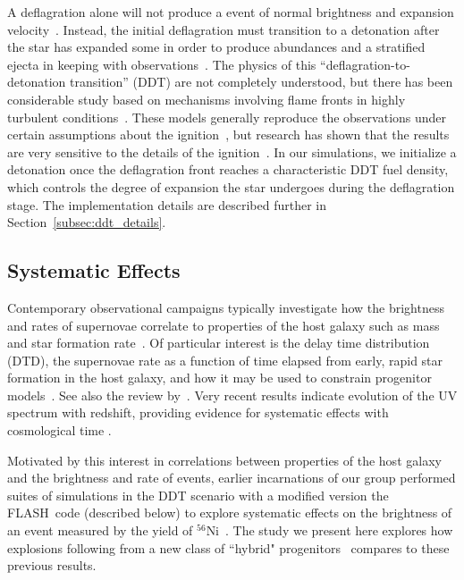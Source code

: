 \documentclass[iop,apj]{emulateapj}
\newcommand{\secref}[1]{Section~\ref{#1}}
\newcommand{\code}[1]{\textsc{#1}}
\newcommand{\FLASH}{\code{FLASH}}
\begin{document}
A deflagration alone will not produce a event of normal brightness and
expansion velocity~\citep{roepkeetal07}. Instead, the initial
deflagration must transition to a detonation after the star has
expanded some in order to produce abundances and a stratified ejecta
in keeping with
observations~\citep{Khokhlov1991Delayed-detonat,hokowh95}.
The physics of this ``deflagration-to-detonation transition'' (DDT)
are not completely understood, but there has been considerable study
based on mechanisms involving flame fronts in highly turbulent
conditions~\citep{1986SvAL, woosley90, Khokhlov1991Delayed-detonat,
  hokowh95, HoefKhok96, khoketal1997, NiemWoos97, hwt98, Niem99,
  GameKhokOran05,roepke07, poletal2011,c-ssr2013,poludnenko2015}.
These models generally reproduce the observations under certain
assumptions about the ignition~\citep{townetal2009}, but research has
shown that the results are very sensitive to the details of the
ignition~\citep{PlewCaldLamb04,GameKhokOran05,garciasenz:2005,
  roepkeetal07,Jordan2008Three-Dimension}.
In our simulations, we
initialize a detonation once the deflagration front reaches a
characteristic DDT fuel density, which controls the degree of
expansion the star undergoes during the deflagration stage. The
implementation details are described further in
\secref{subsec:ddt_details}.


\subsection{Systematic Effects}

Contemporary observational campaigns typically investigate how
the brightness and rates of supernovae correlate to 
properties of the host galaxy such as mass and star formation
rate~\citep[c.f.][]{graurmaoz2013,graurbiancomodjaz2015}. Of
particular interest is the delay time distribution (DTD), the
supernovae rate as a function of time elapsed from 
early, rapid
star formation in the host galaxy, and how it may be used
to constrain progenitor models~\citep{hachisu:2008,
conleyetal2011,howell2011,grauretal2011,biancoetal2011,maozmannuccibrandt2012}.
See also the review by~\citet{maozmannucci2012}.
Very recent results indicate evolution of the UV spectrum with 
redshift, providing evidence for systematic effects with
cosmological time \citep{milneandfoley2015}.

Motivated by this interest in correlations between properties of the
host galaxy and the brightness and rate of events, earlier incarnations of  
our group performed suites of simulations in the DDT scenario
with a modified version the \FLASH\ code (described below) to explore
systematic effects on the brightness of an event measured by the yield of
$^{56}$Ni~\citep{Krueger2010On-Variations-o,jacketal2010,kruegetal12}. The
study we present here explores how explosions following from a new class
of ``hybrid" 
progenitors~\citep{denissenkovetal2013,chenetal2014,denissenkovetal2015} 
compares to these previous results.
\end{document}
